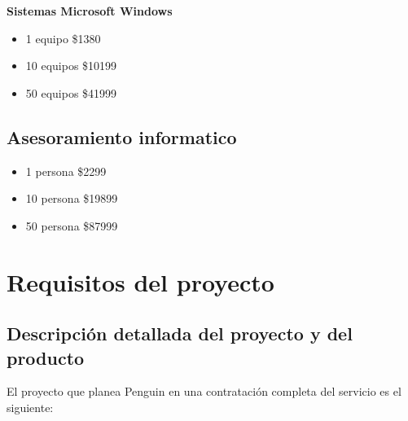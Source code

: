 \documentclass{article}
\begin{document}
		\textbf{Sistemas Microsoft Windows}
		\begin{itemize}
		\item 1 equipo \dotfill \$1380
		\item 10 equipos \dotfill \$10199
		\item 50 equipos \dotfill \$41999
		\end{itemize}
	
	\subsection{Asesoramiento informatico}
		\begin{itemize}
		\item 1 persona \dotfill \$2299
		\item 10 persona \dotfill \$19899
		\item 50 persona \dotfill \$87999
		\end{itemize}

\pagebreak

\section{Requisitos del proyecto}
	\subsection{Descripción detallada del proyecto y del producto}
		El proyecto que planea Penguin en una 
		contratación completa del servicio es el siguiente:
		
\end{document}
